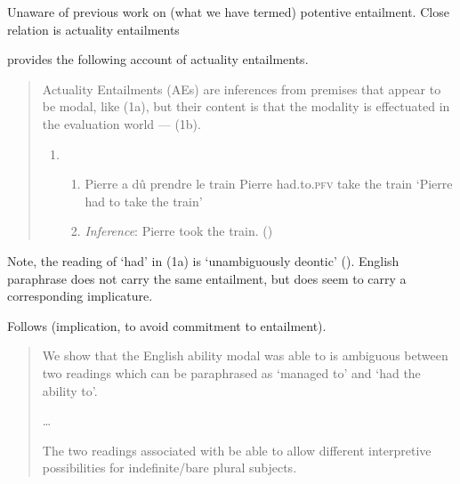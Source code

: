 \begin{note}
  Unaware of previous work on (what we have termed) potentive entailment.
  Close relation is actuality entailments

    \textcite{Alxatib:2019wf} provides the following account of actuality entailments.
  \begin{quote}
    Actuality Entailments (AEs) are inferences from premises that appear to be modal, like (1a), but their content is that the modality is effectuated in the evaluation world --- (1b).

    \begin{enumerate}[label=(\arabic*)]
    \item
      \begin{enumerate}[label=\alph*.]
      \item Pierre a dû \hspace{26pt} prendre le \hspace{3.5pt} train \newline
        Pierre had.to.\textsc{pfv} take \hspace{14pt} the train\newline
        \hspace{-4pt} ‘Pierre had to take the train'
      \item \emph{Inference}: Pierre took the train.\nolinebreak
    \mbox{}\hfill\mbox{(\citeyear[701]{Alxatib:2019wf})}
      \end{enumerate}
    \end{enumerate}
  \end{quote}

  Note, the reading of `had' in (1a) is `unambiguously deontic' (\citeyear[703]{Alxatib:2019wf}).
  English paraphrase does not carry the same entailment, but does seem to carry a corresponding implicature.

  Follows \textcite{Bhatt:1999wq} (implication, to avoid commitment to entailment).

  \begin{quote}
    We show that the English ability modal was able to is ambiguous between two readings which can be paraphrased as `managed to' and `had the ability to'.

    \dots

    The two readings associated with be able to allow different interpretive possibilities for indefinite/bare plural subjects.


\end{quote}
\end{note}
